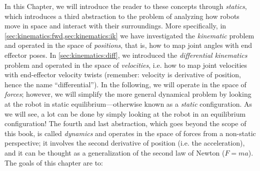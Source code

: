 In this Chapter, we will introduce the reader to these concepts through \textsl{statics}, which introduces a third abstraction to the problem of analyzing how robots move in space and interact with their surroundings.
More specifically, in \cref{sec:kinematics:fwd,sec:kinematics:ik} we have investigated the \textsl{kinematic} problem and operated in the space of \textsl{positions}, that is, how to map joint angles with end effector poses.
In \cref{sec:kinematics:diff}, we introduced the \textsl{differential kinematics} problem and operated in the space of \textsl{velocities}, i.e. how to map joint velocities with end-effector velocity twists (remember: velocity is derivative of position, hence the name ``differential'').
In the following, we will operate in the space of \textsl{forces}; however, we will simplify the more general dynamical problem by looking at the robot in static equilibrium---otherwise known as a \textsl{static} configuration.
As we will see, a lot can be done by simply looking at the robot in an equilibrium configuration!
The fourth and last abstraction, which goes beyond the scope of this book, is called \textsl{dynamics} and operates in the space of forces from a non-static perspective; it involves the second derivative of position (i.e. the acceleration), and it can be thought as a generalization of the second law of Newton ($F=ma$).
%
The goals of this chapter are to:

